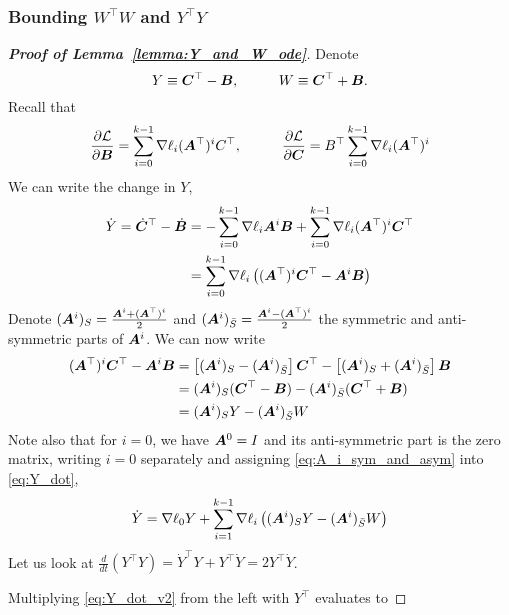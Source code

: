 \subsubsection{Bounding $W^\top W$ and $Y^\top Y$}

\begin{proof}[\textbf{Proof of Lemma~\ref{lemma:Y_and_W_ode}}]
Denote
\begin{equation}
    Y\equiv {\bm{C}}^\top -{\bm{B}}, \hspace{1cm} W\equiv {\bm{C}}^\top + {\bm{B}}.
\end{equation}
Recall that
\begin{equation}
    \frac{\partial\mathcal{L}}{\partial {\bm{B}}} = \sum_{i=0}^{k-1}\nabla\ell_i ({\bm{A}}^\top)^i C^\top, \hspace{1cm} \frac{\partial\mathcal{L}}{\partial {\bm{C}}} = B^\top\sum_{i=0}^{k-1}\nabla\ell_i ({\bm{A}}^\top)^i
\end{equation}
We can write the change in $Y$,
\begin{align}\label{eq:Y_dot}
    \dot{Y} =\dot{{\bm{C}}}^\top - \dot{{\bm{B}}} & = -\sum_{i=0}^{k-1}\nabla\ell_i {\bm{A}}^i{\bm{B}} + \sum_{i=0}^{k-1}\nabla\ell_i ({\bm{A}}^\top)^i {\bm{C}}^\top\\
    & = \sum_{i=0}^{k-1}\nabla\ell_i\left(({\bm{A}}^\top)^i{\bm{C}}^\top - {\bm{A}}^i{\bm{B}}\right)\nonumber
\end{align}
Denote $({\bm{A}}^i)_S=\frac{{\bm{A}}^i+({\bm{A}}^\top)^i}{2}$ and $({\bm{A}}^i)_{\bar{S}}=\frac{{\bm{A}}^i-({\bm{A}}^\top)^i}{2}$ the symmetric and anti-symmetric parts of ${\bm{A}}^i$. We can now write
\begin{align}\label{eq:A_i_sym_and_asym}
    ({\bm{A}}^\top)^i{\bm{C}}^\top - {\bm{A}}^i{\bm{B}} & =\left[({\bm{A}}^i)_S - ({\bm{A}}^i)_{\bar{S}}\right]{\bm{C}}^\top - \left[({\bm{A}}^i)_S + ({\bm{A}}^i)_{\bar{S}}\right]{\bm{B}}\\
    & = ({\bm{A}}^i)_S({\bm{C}}^\top - {\bm{B}}) - ({\bm{A}}^i)_{\bar{S}}({\bm{C}}^\top + {\bm{B}})\nonumber\\
    & = ({\bm{A}}^i)_S Y - ({\bm{A}}^i)_{\bar{S}}W\nonumber
\end{align}
Note also that for $i=0$, we have ${\bm{A}}^0=I$ and its anti-symmetric part is the zero matrix, writing $i=0$ separately and assigning \eqref{eq:A_i_sym_and_asym} into \eqref{eq:Y_dot},
\begin{equation}\label{eq:Y_dot_v2}
    \dot{Y} = \nabla\ell_0 Y + \sum_{i=1}^{k-1}\nabla\ell_i\left(({\bm{A}}^i)_S Y - ({\bm{A}}^i)_{\bar{S}}W\right)
\end{equation}
Let us look at $\frac{d}{dt}(Y^\top Y)=\dot{Y}^\top Y + Y^\top \dot{Y}=2Y^\top\dot{Y}$.

Multiplying \eqref{eq:Y_dot_v2} from the left with $Y^\top$ evaluates to


\end{proof}
